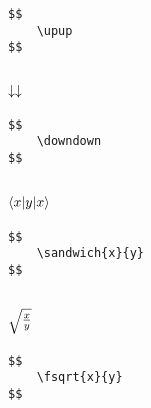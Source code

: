 \documentclass[a4paper]{article}
\begin{document}
\begin{verbatim}
$$
	\upup
$$
\end{verbatim}

\subsection{$ \downarrow \downarrow$}

\begin{verbatim}
$$
	\downdown
$$
\end{verbatim}

\subsection{$  \langle x| y  |x\rangle$}

\begin{verbatim}
$$
	\sandwich{x}{y}
$$
\end{verbatim}

\subsection{$ \sqrt{\frac{x}{y}}$}

\begin{verbatim}
$$
	\fsqrt{x}{y}
$$
\end{verbatim}
\end{document}
